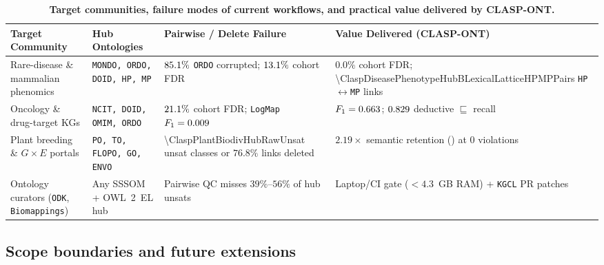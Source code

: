 \documentclass[10pt]{article}
\theoremstyle{accentdef}
\begin{document}
\begin{table}[t]
\centering
\caption{\textbf{Target communities, failure modes of current workflows, and practical value delivered by \textsc{CLASP-ONT}.}}
\label{tab:stakeholders}
\footnotesize
\setlength{\tabcolsep}{4.8pt}
\begin{tabularx}{\textwidth}{@{}>{\raggedright\arraybackslash}p{3.4cm}>{\raggedright\arraybackslash}p{2.9cm}>{\raggedright\arraybackslash}X>{\raggedright\arraybackslash}X@{}}
\toprule
\textbf{Target Community} & \textbf{Hub Ontologies} & \textbf{Pairwise / Delete Failure} & \textbf{Value Delivered (\textsc{CLASP-ONT})} \\
\midrule
Rare-disease \& mammalian phenomics & \texttt{MONDO, ORDO, DOID, HP, MP} & $85.1{}\%$ \texttt{ORDO} corrupted; $13.1{}\%$ cohort FDR & $0.0\%$ cohort FDR; \num{\ClaspDiseasePhenotypeHubBLexicalLatticeHPMPPairs} \texttt{HP}$\leftrightarrow$\texttt{MP} links \\
\addlinespace[2.5pt]
Oncology \& drug-target KGs & \texttt{NCIT, DOID, OMIM, ORDO} & $21.1{}\%$ cohort FDR; \texttt{LogMap} $F_1 = 0.009{}$ & $F_1 = 0.663{}$; $0.829{}$ deductive $\sqsubseteq$ recall \\
\addlinespace[2.5pt]
Plant breeding \& $G \times E$ portals & \texttt{PO, TO, FLOPO, GO, ENVO} & \num{\ClaspPlantBiodivHubRawUnsat} unsat classes or $76.8\%$ links deleted & $2.19\times$ semantic retention (\ClaspPlantBiodivHubBLexicalLatticeRetention{}) at $0$ violations \\
\addlinespace[2.5pt]
Ontology curators (\texttt{ODK}, \texttt{Biomappings}) & Any SSSOM + OWL~2~EL hub & Pairwise QC misses $39\%\text{--}56\%$ of hub unsats & Laptop/CI gate ($<4.3$~GB RAM) + \texttt{KGCL} PR patches \\
\bottomrule
\end{tabularx}
\end{table}

\subsection*{Scope boundaries and future extensions}
\end{document}
